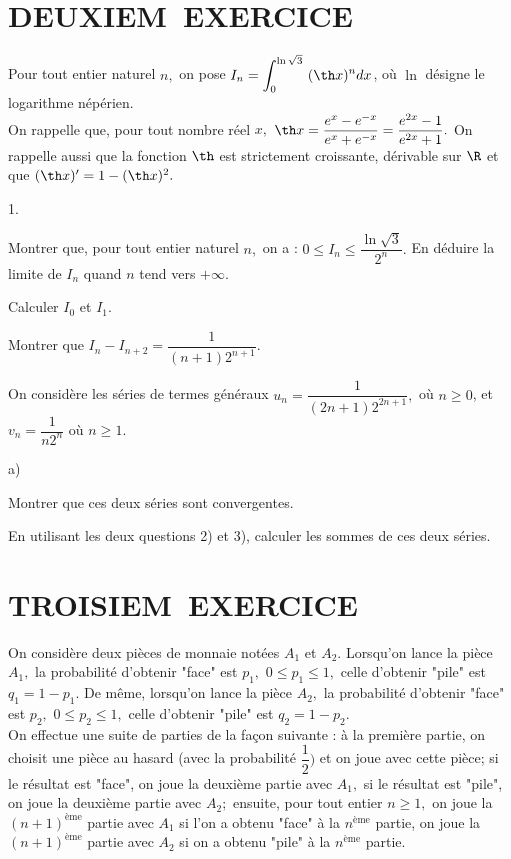 \documentclass[11pt]{article}%
\begin{document}
\section*{DEUXIEM\E\ EXERCICE}

Pour tout entier naturel $n,$ on pose $I_{n} = \dint{0}{\ln \sqrt{3}}(
\th x)^{n}dx$, où $\ln $ désigne le logarithme népérien.\\
On rappelle que, pour tout nombre réel $x,$ $\th x =
\dfrac{e^{x}-e^{-x}}{e^{x} + e^{-x}} = \dfrac{e^{2x}-1}{e^{2x} + 1}.$
On rappelle aussi que la fonction 
$\th$ est strictement croissante, dérivable sur $\R$ et que $(\th
x)^{\prime } = 1-(\th x)^{2}.$

\begin{noliste}{1.}
 \setlength{\itemsep}{4mm}
\item Montrer que, pour tout entier naturel $n,$ on a : $0\leq
I_{n}\leq \dfrac{\ln \sqrt{3}}{2^{n}}.$ En déduire la limite de $I_{n}$
quand $n$ tend vers $ + \infty.$

\item Calculer $I_{0}$ et $I_{1}.$

\item Montrer que $I_{n}-I_{n + 2} = \dfrac{1}{(n + 1)2^{n + 1}}.$

\item On considère les séries de termes généraux $u_{n} = \dfrac{1}{(2n
+ 1)2^{2n + 1}},$ où $n\geq 0$, et $v_{n} = \dfrac{1}{n2^{n}}$ où
$n\geq 1.$

\begin{noliste}{a)}
 \setlength{\itemsep}{2mm}
\item Montrer que ces deux séries sont convergentes.

\item En utilisant les deux questions 2) et 3), calculer les sommes de
ces
deux séries.
\end{noliste}
\end{noliste}

\newpage

\section*{TROISIEM\E\ EXERCICE}

On considère deux pièces de monnaie notées $A_{1}$ et $A_{2}$.
Lorsqu'on
lance la pièce $A_{1},$ la probabilité d'obtenir "face" est $p_{1},$
$0\leq p_{1}\leq 1,$ celle d'obtenir "pile" est $q_{1} = 1-p_{1}.$ De
même, lorsqu'on lance la pièce $A_{2},$ la probabilité d'obtenir "face"
est $p_{2},$ $0\leq p_{2}\leq 1,$ celle d'obtenir "pile" est $q_{2} =
1-p_{2}.$\\
On effectue une suite de parties de la façon suivante : à la première
partie, on choisit une pièce au hasard (avec la probabilité
$\dfrac{1}{2})$
et on joue avec cette pièce; si le résultat est "face", on joue la
deuxième
partie avec $A_{1},$ si le résultat est "pile", on joue la deuxième
partie
avec $A_{2};$ ensuite, pour tout entier $n\geq 1,$ on joue la $(n +
1)^{\text{ème}}$ partie avec $A_{1}$ si l'on a obtenu "face" à la
$n^{\text{ème}} $ partie, on joue la $(n + 1)^{\text{ème}}$ partie avec
$A_{2}$ si on a
obtenu "pile" à la $n^{\text{ème}}$ partie.
\end{document}
